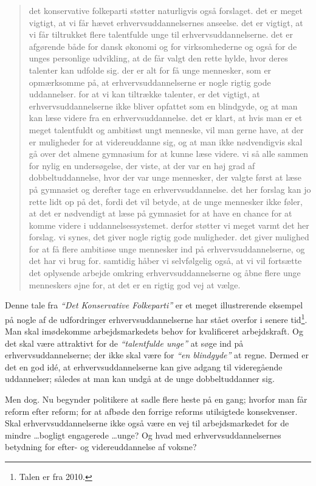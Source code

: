 \begin{quotation}
det konservative folkeparti støtter naturligvis også forslaget. det er meget vigtigt, at vi får hævet erhvervsuddannelsernes anseelse. det er vigtigt, at vi får tiltrukket flere talentfulde unge til erhvervsuddannelserne. det er afgørende både for dansk økonomi og for virksomhederne og også for de unges personlige udvikling, at de får valgt den rette hylde, hvor deres talenter kan udfolde sig. der er alt for få unge mennesker, som er opmærksomme på, at erhvervsuddannelserne er nogle rigtig gode uddannelser. for at vi kan tiltrække talenter, er det vigtigt, at erhvervsuddannelserne ikke bliver opfattet som en blindgyde, og at man kan læse videre fra en erhvervsuddannelse. det er klart, at hvis man er et meget talentfuldt og ambitiøst ungt menneske, vil man gerne have, at der er muligheder for at videreuddanne sig, og at man ikke nødvendigvis skal gå over det almene gymnasium for at kunne læse videre. vi så alle sammen for nylig en undersøgelse, der viste, at der var en høj grad af dobbeltuddannelse, hvor der var unge mennesker, der valgte først at læse på gymnasiet og derefter tage en erhvervsuddannelse. det her forslag kan jo rette lidt op på det, fordi det vil betyde, at de unge mennesker ikke føler, at det er nødvendigt at læse på gymnasiet for at have en chance for at komme videre i uddannelsessystemet. derfor støtter vi meget varmt det her forslag. vi synes, det giver nogle rigtig gode muligheder. det giver mulighed for at få flere ambitiøse unge mennesker ind på erhvervsuddannelserne, og det har vi brug for. samtidig håber vi selvfølgelig også, at vi vil fortsætte det oplysende arbejde omkring erhvervsuddannelserne og åbne flere unge menneskers øjne for, at det er en rigtig god vej at vælge.
\end{quotation}

Denne tale fra \textit{“Det Konservative Folkeparti”} er et meget illustrerende eksempel på nogle af de udfordringer erhvervsuddannelserne har stået overfor i senere tid\footnote{Talen er fra 2010.}.
Man skal imødekomme arbejdsmarkedets behov for kvalificeret arbejdskraft.
Og det skal være attraktivt for de \textit{“talentfulde unge”} at søge ind på erhvervsuddannelserne; der ikke skal være for \textit{“en blindgyde”} at regne.
Dermed er det en god idé, at erhvervsuddannelserne kan give adgang til videregående uddannelser; således at man kan undgå at de unge dobbeltuddanner sig.

Men dog.
Nu begynder politikere at sadle flere heste på en gang; hvorfor man får reform efter reform; for at afbøde den forrige reforms utilsigtede konsekvenser.
Skal erhvervsuddannelserne ikke også være en vej til arbejdsmarkedet for de mindre \ldots bogligt engagerede \ldots unge?
Og hvad med erhvervsuddannelsernes betydning for efter- og videreuddannelse af voksne?

